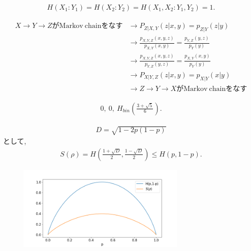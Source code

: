 \begin{ex}
    \label{ex11.9}
    \begin{align*}
        H(X_1 : Y_1) = H(X_2 : Y_2) =  H(X_1, X_2 : Y_1, Y_2) = 1.
    \end{align*}
\end{ex}

\begin{ex}
    \label{ex11.10}
    \begin{align*}
        X \to Y \to Z \mathrm{がMarkov\ chainをなす}
         & \longrightarrow
        P_{Z|X,Y}(z|x,y) = p_{Z|Y}(z|y)                                       \\
         & \longrightarrow
        \frac{p_{X,Y,Z}(x,y,z)}{p_{X,Y}(x,y)} = \frac{p_{Y,Z}(y,z)}{p_{Y}(y)} \\
         & \longrightarrow
        \frac{p_{X,Y,Z}(x,y,z)}{p_{Y,Z}(y,z)} = \frac{p_{X,Y}(x,y)}{p_{Y}(y)} \\
         & \longrightarrow
        P_{X|Y,Z}(z|x,y) = p_{X|Y}(x|y)                                       \\
         & \longrightarrow
        Z \to Y \to X \mathrm{がMarkov\ chainをなす}
    \end{align*}
\end{ex}

\begin{ex}
    \label{ex11.11}
    \begin{align*}
        0,\ 0, \ H_{bin}\left( \frac{3 + \sqrt{5}}{6}\right).
    \end{align*}
\end{ex}

\begin{ex}
    \label{ex11.12}
    \begin{align*}
        D = \sqrt{1-2p(1-p)}
    \end{align*}
    として,
    \begin{align*}
        S\left( \rho\right) = H\left( \frac{1 + \sqrt{D}}{2}, \frac{1 - \sqrt{D}}{2}\right) \leq H(p,1-p).
    \end{align*}
    \begin{figure}[H]
        \begin{center}
            \includegraphics[width = 80mm]{./fig/ex11_12.png}
        \end{center}
    \end{figure}
\end{ex}

